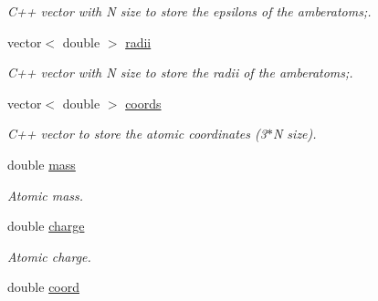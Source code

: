 \begin{DoxyCompactItemize}
\begin{DoxyCompactList}\small\item\em C++ vector with N size to store the epsilons of the amberatoms;. \item\end{DoxyCompactList}\item 
\hypertarget{classPRMTOP_a91fac95c4d64aa1ef1e2c1c9eabda370}{
vector$<$ double $>$ \hyperlink{classPRMTOP_a91fac95c4d64aa1ef1e2c1c9eabda370}{radii}}
\label{classPRMTOP_a91fac95c4d64aa1ef1e2c1c9eabda370}

\begin{DoxyCompactList}\small\item\em C++ vector with N size to store the radii of the amberatoms;. \item\end{DoxyCompactList}\item 
\hypertarget{classPRMTOP_a08bae98f1227295af546593e7aadef3f}{
vector$<$ double $>$ \hyperlink{classPRMTOP_a08bae98f1227295af546593e7aadef3f}{coords}}
\label{classPRMTOP_a08bae98f1227295af546593e7aadef3f}

\begin{DoxyCompactList}\small\item\em C++ vector to store the atomic coordinates (3$\ast$N size). \item\end{DoxyCompactList}\item 
\hypertarget{classPRMTOP_a184999818da0e3c7bf66c4a6020a7471}{
double \hyperlink{classPRMTOP_a184999818da0e3c7bf66c4a6020a7471}{mass}}
\label{classPRMTOP_a184999818da0e3c7bf66c4a6020a7471}

\begin{DoxyCompactList}\small\item\em Atomic mass. \item\end{DoxyCompactList}\item 
\hypertarget{classPRMTOP_a93c7af00cb35b054ab17ce782e88c008}{
double \hyperlink{classPRMTOP_a93c7af00cb35b054ab17ce782e88c008}{charge}}
\label{classPRMTOP_a93c7af00cb35b054ab17ce782e88c008}

\begin{DoxyCompactList}\small\item\em Atomic charge. \item\end{DoxyCompactList}\item 
\hypertarget{classPRMTOP_aefdd26dacafbc4f13fa7b94c6553878b}{
double \hyperlink{classPRMTOP_aefdd26dacafbc4f13fa7b94c6553878b}{coord}}
\label{classPRMTOP_aefdd26dacafbc4f13fa7b94c6553878b}


\end{DoxyCompactItemize}
